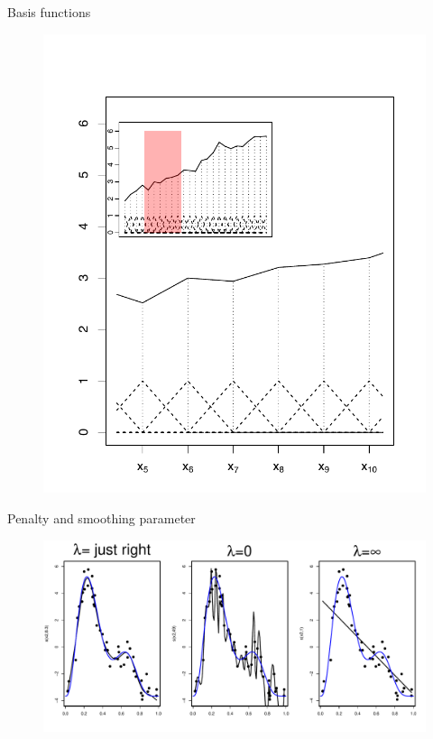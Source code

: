 \documentclass{beamer}
\begin{document}
\begin{frame}{Basis functions}
  \begin{figure}[h]
    \begin{center}
      \includegraphics[height=0.9\textheight]{figures/fem.pdf}
    \end{center}
  \end{figure}
\end{frame}

\begin{frame}{Penalty and smoothing parameter}
  \begin{figure}[h]
    \begin{center}
      \includegraphics[width=\textwidth]{figures/penalty.pdf}
    \end{center}
  \end{figure}
\end{frame}
\end{document}
